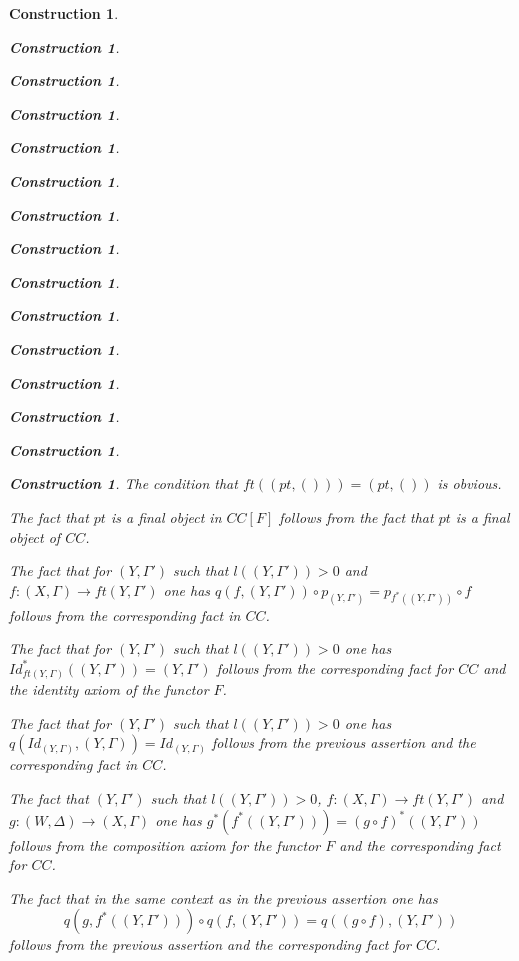\documentclass[12pt]{amsart}
\newtheorem{construction}[proposition]{Construction}
\newcommand{\sr}{\rightarrow}
\begin{document}
\begin{construction}
\begin{construction}
\begin{construction}
\begin{construction}
\begin{construction}
\begin{construction}
\begin{construction}
\begin{construction}
\begin{construction}
\begin{construction}
\begin{construction}
\begin{construction}
\begin{construction}
\begin{construction}
\begin{construction}
The condition that $ft((pt,()))=(pt,())$ is obvious. 

The fact that $pt$ is a final object in $CC[F]$ follows from the fact that $pt$ is a final object of $CC$.

The fact that for $(Y,\Gamma')$ such that $l((Y,\Gamma'))>0$ and $f:(X,\Gamma)\sr ft(Y,\Gamma')$ one has $q(f,(Y,\Gamma'))\circ p_{(Y,\Gamma')}=p_{f^*((Y,\Gamma'))}\circ f$ follows from the corresponding fact in $CC$.

The fact that for $(Y,\Gamma')$ such that $l((Y,\Gamma'))>0$ one has $Id_{ft(Y,\Gamma)}^*((Y,\Gamma'))=(Y,\Gamma')$ follows from the corresponding fact for $CC$ and the identity axiom of the functor $F$. 

The fact that for $(Y,\Gamma')$ such that $l((Y,\Gamma'))>0$ one has $q(Id_{(Y,\Gamma)},(Y,\Gamma))=Id_{(Y,\Gamma)}$ follows from the previous assertion and the corresponding fact in $CC$.

The fact that $(Y,\Gamma')$ such that $l((Y,\Gamma'))>0$, $f:(X,\Gamma)\sr ft(Y,\Gamma')$ and $g:(W,\Delta)\sr (X,\Gamma)$ one has $g^*(f^*((Y,\Gamma')))=(g\circ f)^*((Y,\Gamma'))$ follows from the composition axiom for the functor $F$ and the corresponding fact for $CC$.

The fact that in the same context as in the previous assertion one has
%
$$q(g,f^*((Y,\Gamma')))\circ q(f,(Y,\Gamma'))=q((g\circ f),(Y,\Gamma'))$$
%
follows from the previous assertion and the corresponding fact for $CC$. 


\end{construction}
\end{construction}
\end{construction}
\end{construction}
\end{construction}
\end{construction}
\end{construction}
\end{construction}
\end{construction}
\end{construction}
\end{construction}
\end{construction}
\end{construction}
\end{construction}
\end{construction}
\end{document}
